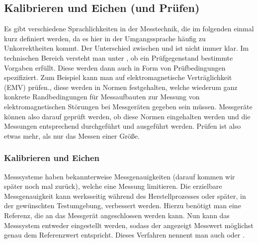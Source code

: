 \documentclass[letterpaper,10pt,english]{jupyterBook}
\begin{document}
\subsection{Kalibrieren und Eichen (und Prüfen)}
\label{\detokenize{content/0_Basics:kalibrieren-und-eichen-und-prufen}}
\sphinxAtStartPar


\sphinxAtStartPar
Es gibt verschiedene Sprachlichkeiten in der Messtechnik, die im folgenden einmal kurz definiert werden, da es hier in der Umgangssprache häufig zu Unkorrektheiten kommt. Der Unterschied zwischen  und  ist nicht immer klar. Im technischen Bereich versteht man unter , ob ein Prüfgegenstand bestimmte Vorgaben erfüllt. Diese werden dann auch in Form von Prüfbedingungen spezifiziert. Zum Beispiel kann man auf elektromagnetische Verträglichkeit (EMV) prüfen., diese werden in Normen festgehalten, welche wiederum ganz konkrete Randbedingungen für Messaufbauten \sphinxhyphen{} zur Messung von elektromagnetischen Störungen \sphinxhyphen{} bei Messgeräten gegeben sein müssen. Messgeräte können also darauf geprüft werden, ob diese Normen eingehalten werden und die Messungen entsprechend durchgeführt und ausgeführt werden. Prüfen ist also etwas mehr, als nur das Messen einer Größe.


\subsubsection{Kalibrieren und Eichen}
\label{\detokenize{content/0_Basics:kalibrieren-und-eichen}}
\sphinxAtStartPar


\sphinxAtStartPar
Messsysteme haben bekannterweise Messgenauigkeiten (darauf kommen wir später noch mal zurück), welche eine Messung limitieren. Die erzielbare Messgenauigkeit kann werksseitig während des Herstellprozesses oder später, in der gewünschten Testumgebung, verbessert werden. Hierzu benötigt man eine  Referenz, die an das Messgerät angeschlossen werden kann. Nun kann das Messsystem entweder eingestellt werden, sodass der angezeigt Messwert möglichst genau dem  Referenzwert entspricht. Dieses Verfahren nennent man auch  oder .

\sphinxAtStartPar
{}
\end{document}
